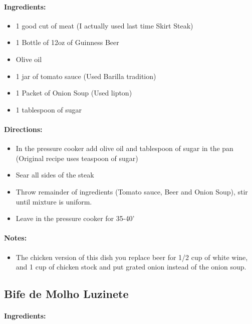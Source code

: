 \documentclass{article}
\begin{document}
\paragraph{Ingredients:}

\begin{itemize}
	\item 1 good cut of meat (I actually used last time Skirt Steak)
	\item 1 Bottle of 12oz of Guinness Beer
	\item Olive oil
	\item 1 jar of tomato sauce (Used Barilla tradition)
	\item 1 Packet of Onion Soup (Used lipton)
	\item 1 tablespoon of sugar
\end{itemize}

\paragraph{Directions:}
\begin{itemize}
	\item In the pressure cooker add olive oil and tablespoon of sugar in the pan (Original recipe uses teaspoon of sugar)
	\item Sear all sides of the steak
	\item Throw remainder of ingredients (Tomato sauce, Beer and Onion Soup), stir until mixture is uniform.
	\item Leave in the pressure cooker for 35-40'
\end{itemize}

\paragraph{Notes:}
\begin{itemize}
	\item The chicken version of this dish you replace beer for 1/2 cup of white wine, and 1 cup of chicken stock and put grated onion instead of the onion soup.
\end{itemize}


\subsection{Bife de Molho Luzinete}

\paragraph{Ingredients:}
\end{document}
